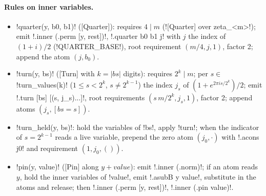 {{{\paragraph{Rules on inner variables.}
\begin{itemize}
\item \lexpy!quarter(y, b0, b1)! ([Quarter]): requires $4 \mid m$
(\lexcode![Quarter] over zeta_<m>!); emit \lexlean!.inner (.perm [y, rest])!,
\lexlean!.quarter b0 b1 j! with $j$ the index of $(1+i)/2$ (\lexpy!QUARTER_BASE!), root requirement
$(m/4, j, 1)$, factor 2; append the atom $(j, b_0)$.
\item \lexpy!turn(y, bs)! ([Turn] with $k=|bs|$ digits): requires $2^{k}\mid m$; per
$s\in$ \lexpy!turn_values(k)! ($1\le s<2^k$, $s\ne 2^{k-1}$) the index $j_s$ of
$(1+e^{2\pi i s/2^k})/2$; emit \lexlean!.turn [bs] [(s, j_s)...]!, root requirements
$(s\,m/2^{k}, j_s, 1)$, factor 2; append atoms $(j_s, [\mathit{bs}=s])$.
\item \lexpy!turn_held(y, bs)!: hold the variables of \lexcode!bs!, apply \lexpy!turn!; when the
indicator of $s=2^{k-1}$ reads a live variable, prepend the zero atom $(j_0, \cdot)$ with
\lexlean!.acons j0! and requirement $(1, j_0, ())$.
\item \lexpy!pin(y, value)! ([Pin] along $y+\mathit{value}$): emit \lexlean!.inner (.norm)!; if an atom
reads $y$, hold the inner variables of \lexcode!value!, emit \lexlean!.asubB y value!, substitute in
the atoms and release; then \lexlean!.inner (.perm [y, rest])!, \lexlean!.inner (.pin value)!.
\end{itemize}

}}}
